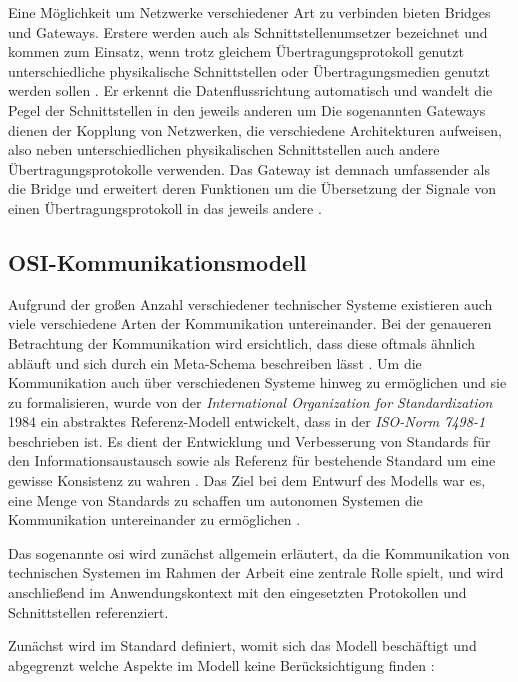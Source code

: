 Eine Möglichkeit um Netzwerke verschiedener Art zu verbinden bieten Bridges und Gateways. Erstere werden auch als Schnittstellenumsetzer bezeichnet und kommen zum Einsatz, wenn trotz gleichem Übertragungsprotokoll genutzt unterschiedliche physikalische Schnittstellen oder Übertragungsmedien genutzt werden sollen \cite[S.~80f.]{schn06}. Er erkennt die Datenflussrichtung automatisch und wandelt die Pegel der Schnittstellen in den jeweils anderen um \cite[S.~21]{sch08}
Die sogenannten Gateways dienen der Kopplung von Netzwerken, die verschiedene Architekturen aufweisen, also neben unterschiedlichen physikalischen Schnittstellen auch andere Übertragungsprotokolle verwenden. Das Gateway ist demnach umfassender als die Bridge und erweitert deren Funktionen um die Übersetzung der Signale von einen Übertragungsprotokoll in das jeweils andere \cite[S.~84f.]{schn06}.



\subsection{OSI-Kommunikationsmodell}

Aufgrund der großen Anzahl verschiedener technischer Systeme existieren auch viele verschiedene Arten der Kommunikation untereinander. Bei der genaueren Betrachtung der Kommunikation wird ersichtlich, dass diese oftmals ähnlich abläuft und sich durch ein Meta-Schema beschreiben lässt \cite[S.~8]{schn06}. Um die Kommunikation auch über verschiedenen Systeme hinweg zu ermöglichen und sie zu formalisieren, wurde von der \textit{International Organization for Standardization} 1984 ein abstraktes Referenz-Modell entwickelt, dass in der \textit{ISO-Norm 7498-1} beschrieben ist. Es dient der Entwicklung und Verbesserung von Standards für den Informationsaustausch sowie als Referenz für bestehende Standard um eine gewisse Konsistenz zu wahren \cite[S.~1]{osi96}. Das Ziel bei dem Entwurf des Modells war es, eine Menge von Standards zu schaffen um autonomen Systemen die Kommunikation untereinander zu ermöglichen \cite[S.~4]{osi96}.

Das sogenannte \acrlong{osi} wird zunächst allgemein erläutert, da die Kommunikation von technischen Systemen im Rahmen der Arbeit eine zentrale Rolle spielt, und wird anschließend im Anwendungskontext mit den eingesetzten Protokollen und Schnittstellen referenziert.

Zunächst wird im Standard definiert, womit sich das Modell beschäftigt und abgegrenzt welche Aspekte im Modell keine Berücksichtigung finden \cite[S.~3]{osi96}:

